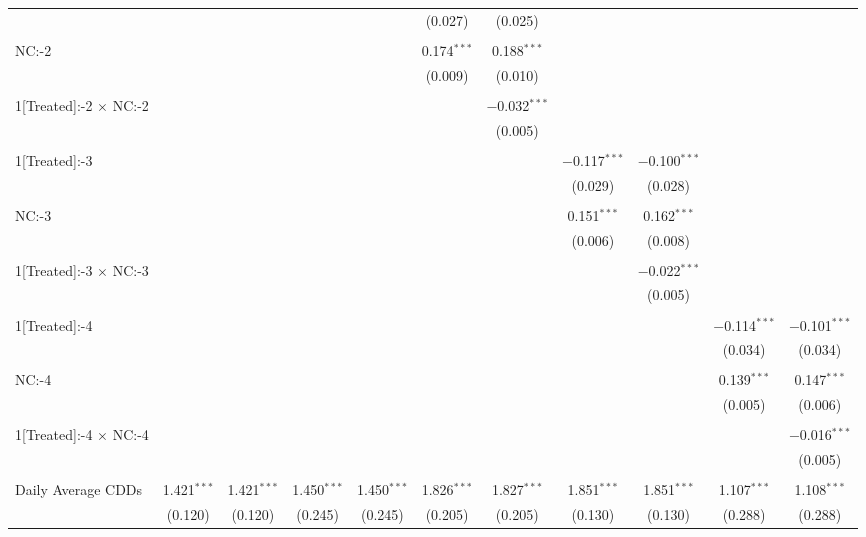 \begin{table}[!htbp]
\begin{tabular}{@{\extracolsep{5pt}}lcccccccccc}
  &  &  &  &  & (0.027) & (0.025) &  &  &  &  \\ 
  & & & & & & & & & & \\ 
 NC:-2 &  &  &  &  & 0.174$^{***}$ & 0.188$^{***}$ &  &  &  &  \\ 
  &  &  &  &  & (0.009) & (0.010) &  &  &  &  \\ 
  & & & & & & & & & & \\ 
 1[Treated]:-2 $\times$ NC:-2 &  &  &  &  &  & $-$0.032$^{***}$ &  &  &  &  \\ 
  &  &  &  &  &  & (0.005) &  &  &  &  \\ 
  & & & & & & & & & & \\ 
 1[Treated]:-3 &  &  &  &  &  &  & $-$0.117$^{***}$ & $-$0.100$^{***}$ &  &  \\ 
  &  &  &  &  &  &  & (0.029) & (0.028) &  &  \\ 
  & & & & & & & & & & \\ 
 NC:-3 &  &  &  &  &  &  & 0.151$^{***}$ & 0.162$^{***}$ &  &  \\ 
  &  &  &  &  &  &  & (0.006) & (0.008) &  &  \\ 
  & & & & & & & & & & \\ 
 1[Treated]:-3 $\times$ NC:-3 &  &  &  &  &  &  &  & $-$0.022$^{***}$ &  &  \\ 
  &  &  &  &  &  &  &  & (0.005) &  &  \\ 
  & & & & & & & & & & \\ 
 1[Treated]:-4 &  &  &  &  &  &  &  &  & $-$0.114$^{***}$ & $-$0.101$^{***}$ \\ 
  &  &  &  &  &  &  &  &  & (0.034) & (0.034) \\ 
  & & & & & & & & & & \\ 
 NC:-4 &  &  &  &  &  &  &  &  & 0.139$^{***}$ & 0.147$^{***}$ \\ 
  &  &  &  &  &  &  &  &  & (0.005) & (0.006) \\ 
  & & & & & & & & & & \\ 
 1[Treated]:-4 $\times$ NC:-4 &  &  &  &  &  &  &  &  &  & $-$0.016$^{***}$ \\ 
  &  &  &  &  &  &  &  &  &  & (0.005) \\ 
  & & & & & & & & & & \\ 
 Daily Average CDDs & 1.421$^{***}$ & 1.421$^{***}$ & 1.450$^{***}$ & 1.450$^{***}$ & 1.826$^{***}$ & 1.827$^{***}$ & 1.851$^{***}$ & 1.851$^{***}$ & 1.107$^{***}$ & 1.108$^{***}$ \\ 
  & (0.120) & (0.120) & (0.245) & (0.245) & (0.205) & (0.205) & (0.130) & (0.130) & (0.288) & (0.288) \\ 

\end{tabular}
\end{table}
